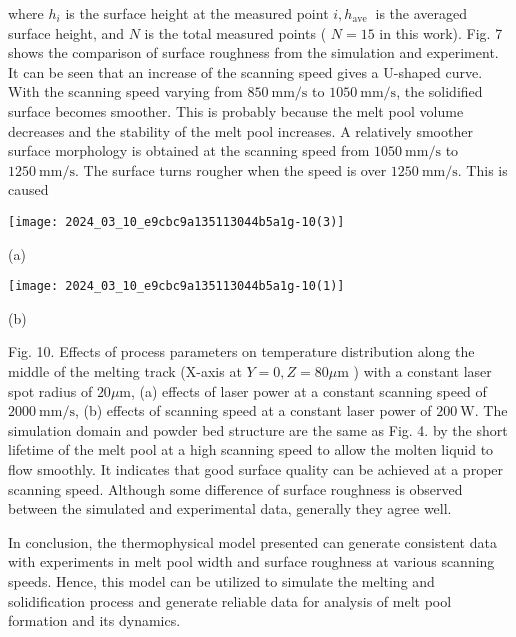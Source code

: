 \documentclass[10pt]{article}
\begin{document}
where $h_{i}$ is the surface height at the measured point $i, h_{\text {ave }}$ is the averaged surface height, and $N$ is the total measured points ( $N=15$ in this work). Fig. 7 shows the comparison of surface roughness from the simulation and experiment. It can be seen that an increase of the scanning speed gives a U-shaped curve. With the scanning speed varying from $850 \mathrm{~mm} / \mathrm{s}$ to $1050 \mathrm{~mm} / \mathrm{s}$, the solidified surface becomes smoother. This is probably because the melt pool volume decreases and the stability of the melt pool increases. A relatively smoother surface morphology is obtained at the scanning speed from $1050 \mathrm{~mm} / \mathrm{s}$ to $1250 \mathrm{~mm} / \mathrm{s}$. The surface turns rougher when the speed is over $1250 \mathrm{~mm} / \mathrm{s}$. This is caused

\begin{center}
\texttt{[image: 2024\_03\_10\_e9cbc9a135113044b5a1g-10(3)]}
\end{center}

(a)

\begin{center}
\texttt{[image: 2024\_03\_10\_e9cbc9a135113044b5a1g-10(1)]}
\end{center}

(b)

Fig. 10. Effects of process parameters on temperature distribution along the middle of the melting track (X-axis at $Y=0, Z=80 \mu \mathrm{m}$ ) with a constant laser spot radius of $20 \mu \mathrm{m}$, (a) effects of laser power at a constant scanning speed of $2000 \mathrm{~mm} / \mathrm{s}$, (b) effects of scanning speed at a constant laser power of $200 \mathrm{~W}$. The simulation domain and powder bed structure are the same as Fig. 4. by the short lifetime of the melt pool at a high scanning speed to allow the molten liquid to flow smoothly. It indicates that good surface quality can be achieved at a proper scanning speed. Although some difference of surface roughness is observed between the simulated and experimental data, generally they agree well.

In conclusion, the thermophysical model presented can generate consistent data with experiments in melt pool width and surface roughness at various scanning speeds. Hence, this model can be utilized to simulate the melting and solidification process and generate reliable data for analysis of melt pool formation and its dynamics.
\end{document}
